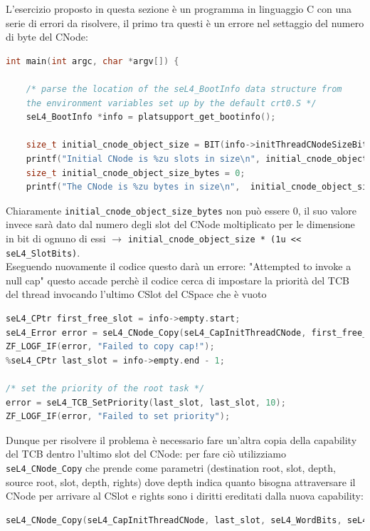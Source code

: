 L'esercizio proposto in questa sezione è un programma in linguaggio C con una serie di errori da risolvere, il primo tra questi è un errore nel settaggio del numero di byte del CNode:
\begin{lstlisting}[language=C++]
int main(int argc, char *argv[]) {

    /* parse the location of the seL4_BootInfo data structure from
    the environment variables set up by the default crt0.S */
    seL4_BootInfo *info = platsupport_get_bootinfo();

    size_t initial_cnode_object_size = BIT(info->initThreadCNodeSizeBits);
    printf("Initial CNode is %zu slots in size\n", initial_cnode_object_size);
    size_t initial_cnode_object_size_bytes = 0;
    printf("The CNode is %zu bytes in size\n", 	initial_cnode_object_size_bytes);
\end{lstlisting}
Chiaramente \texttt{initial\_cnode\_object\_size\_bytes} non può essere 0, il suo valore invece sarà dato dal numero degli slot del CNode moltiplicato per le dimensione in bit di ognuno di essi $\rightarrow$ \texttt{initial\_cnode\_object\_size * (1u << seL4\_SlotBits)}.\\
Eseguendo nuovamente il codice questo darà un errore: "Attempted to invoke a null cap" questo accade perchè il codice cerca di impostare la priorità del TCB del thread invocando l'ultimo CSlot del CSpace che è vuoto
\begin{lstlisting}[language=C++]
seL4_CPtr first_free_slot = info->empty.start;
seL4_Error error = seL4_CNode_Copy(seL4_CapInitThreadCNode, first_free_slot, seL4_WordBits, seL4_CapInitThreadCNode, seL4_CapInitThreadTCB, seL4_WordBits, seL4_AllRights);
ZF_LOGF_IF(error, "Failed to copy cap!");
%seL4_CPtr last_slot = info->empty.end - 1;

/* set the priority of the root task */
error = seL4_TCB_SetPriority(last_slot, last_slot, 10);
ZF_LOGF_IF(error, "Failed to set priority");
\end{lstlisting}
Dunque per risolvere il problema è necessario fare un'altra copia della capability del TCB dentro l'ultimo slot del CNode: per fare ciò utilizziamo \texttt{seL4\_CNode\_Copy} che prende come parametri (destination root, slot, depth, source root, slot, depth, rights) dove depth indica quanto bisogna attraversare il CNode per arrivare al CSlot e rights sono i diritti ereditati dalla nuova capability:
\begin{lstlisting}[language=C++]
seL4_CNode_Copy(seL4_CapInitThreadCNode, last_slot, seL4_WordBits, seL4_CapInitThreadCNode, first_free_slot, seL4_WordBits, seL4_AllRights);
\end{lstlisting}
